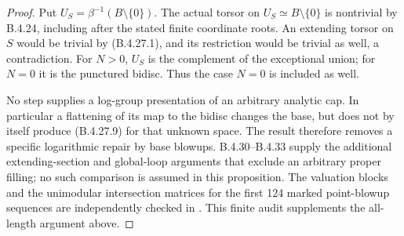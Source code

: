 \begin{proof}
Put $U_S=\beta^{-1}(B\setminus\{0\})$.
The actual torsor on $U_S\simeq B\setminus\{0\}$
is nontrivial by B.4.24, including after the
stated finite coordinate roots. An extending
torsor on $S$ would be trivial by (B.4.27.1),
and its restriction would be trivial as well,
a contradiction. For $N>0$, $U_S$ is the
complement of the exceptional union; for
$N=0$ it is the punctured bidisc. Thus the
case $N=0$ is included as well.

No step supplies a log-group presentation of
an arbitrary analytic cap. In particular a
flattening of its map to the bidisc changes
the base, but does not by itself produce
(B.4.27.9) for that unknown space. The result
therefore removes a specific logarithmic
repair by base blowups. B.4.30--B.4.33 supply the
additional extending-section and global-loop arguments
that exclude an arbitrary proper filling; no such
comparison is assumed in this proposition.
The valuation blocks and the unimodular
intersection matrices for the first 124 marked
point-blowup sequences are independently checked
in . This finite
audit supplements the all-length argument above.
\end{proof}
